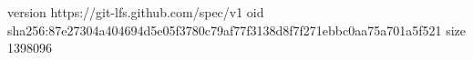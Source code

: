 version https://git-lfs.github.com/spec/v1
oid sha256:87e27304a404694d5e05f3780c79af77f3138d8f7f271ebbc0aa75a701a5f521
size 1398096
